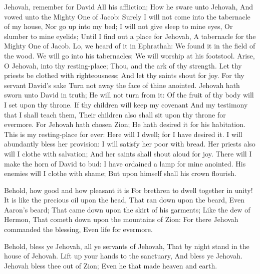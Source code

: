 Jehovah, remember for David All his affliction;  How he sware unto Jehovah, And vowed unto the Mighty One of Jacob:  Surely I will not come into the tabernacle of my house, Nor go up into my bed;  I will not give sleep to mine eyes, Or slumber to mine eyelids;  Until I find out a place for Jehovah, A tabernacle for the Mighty One of Jacob.  Lo, we heard of it in Ephrathah: We found it in the field of the wood.  We will go into his tabernacles; We will worship at his footstool.  Arise, O Jehovah, into thy resting-place; Thou, and the ark of thy strength.  Let thy priests be clothed with righteousness; And let thy saints shout for joy.  For thy servant David’s sake Turn not away the face of thine anointed.  Jehovah hath sworn unto David in truth; He will not turn from it: Of the fruit of thy body will I set upon thy throne.  If thy children will keep my covenant And my testimony that I shall teach them, Their children also shall sit upon thy throne for evermore.  For Jehovah hath chosen Zion; He hath desired it for his habitation.  This is my resting-place for ever: Here will I dwell; for I have desired it.  I will abundantly bless her provision: I will satisfy her poor with bread.  Her priests also will I clothe with salvation; And her saints shall shout aloud for joy.  There will I make the horn of David to bud: I have ordained a lamp for mine anointed.  His enemies will I clothe with shame; But upon himself shall his crown flourish. 

Behold, how good and how pleasant it is For brethren to dwell together in unity!  It is like the precious oil upon the head, That ran down upon the beard, Even Aaron’s beard; That came down upon the skirt of his garments;  Like the dew of Hermon, That cometh down upon the mountains of Zion: For there Jehovah commanded the blessing, Even life for evermore. 

Behold, bless ye Jehovah, all ye servants of Jehovah, That by night stand in the house of Jehovah.  Lift up your hands to the sanctuary, And bless ye Jehovah.  Jehovah bless thee out of Zion; Even he that made heaven and earth. 

